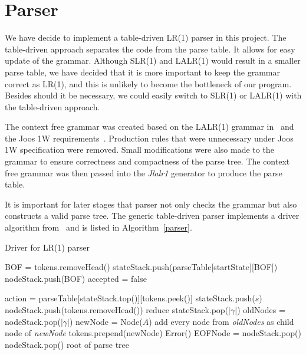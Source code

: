 \section{Parser}
\label{parser_design}

We have decide to implement a table-driven LR(1) parser in this project. The table-driven approach separates the code from the parse table. It allows for easy update of the grammar. Although SLR(1) and LALR(1) would result in a smaller parse table, we have decided that it is more important to keep the grammar correct as LR(1), and this is unlikely to become the bottleneck of our program. Besides should it be necessary, we could easily switch to SLR(1) or LALR(1) with the table-driven approach.

 The context free grammar was created based on the LALR(1) grammar in~\cite{gosling2000java} and the Joos 1W requirements~\cite{joos1w}. Production rules that were unnecessary under Joos 1W specification were removed. Small modifications were also made to the grammar to ensure correctness and compactness of the parse tree. The context free grammar was then passed into the \emph{Jlalr1} generator to produce the parse table.

It is important for later stages that parser not only checks the grammar but also constructs a valid parse tree. The generic table-driven parser implements a driver algorithm from~\cite{fischer2009crafting} and is listed in Algorithm~\ref{parser}.
 
\begin{algorithm}                      %
\caption{Driver for LR(1) parser}          %
\label{parser}                           %
\begin{algorithmic}
\State BOF = tokens.removeHead()  
\State stateStack.push(parseTable[startState][BOF])
\State nodeStack.push(BOF)
\State accepted = false

	\State action = parseTable[stateStack.top()][tokens.peek()]
		\State stateStack.push($s$)
		\State nodeStack.push(tokens.removeHead())
		\Comment reduce
		\State stateStack.pop($|\gamma|$)
		\State oldNodes = nodeStack.pop($|\gamma|$)
		\State newNode = Node($A$)
		\State add every node from \emph{oldNodes} as child node of \emph{newNode}
		\State tokens.prepend(newNode)
	\Else 
		\State Error()
	\EndIf
\EndWhile
\State EOFNode = nodeStack.pop()
\State \Return nodeStack.pop()	\Comment root of parse tree

\end{algorithmic}
\end{algorithm}
 
